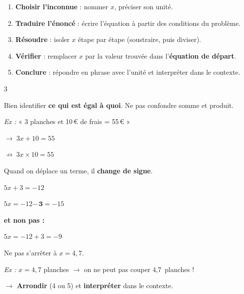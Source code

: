 \documentclass[a4paper,10pt]{article}
\begin{document}
\vspace{2pt}

\begin{methbox}
\begin{enumerate}[label=\textbf{\arabic*.},leftmargin=18pt]
  \item \textbf{Choisir l'inconnue} : nommer $x$, préciser son unité.
  \item \textbf{Traduire l'énoncé} : écrire l'équation à partir des conditions du problème.
  \item \textbf{Résoudre} : isoler $x$ étape par étape (soustraire, puis diviser).
  \item \textbf{Vérifier} : remplacer $x$ par la valeur trouvée dans l'\textbf{équation de départ}.
  \item \textbf{Conclure} : répondre en phrase avec l'unité et interpréter dans le contexte.
\end{enumerate}
\end{methbox}

\vspace{2pt}

\begin{multicols}{3}

\begin{piegebox}
{\small Bien identifier \textbf{ce qui est égal à quoi}. Ne pas confondre somme et produit.

\medskip
\textit{Ex :} « 3 planches et 10\,€ de frais = 55\,€ »

$\rightarrow\; 3x + 10 = 55$

$\not\rightarrow\; 3x \times 10 = 55$}
\end{piegebox}

\columnbreak

\begin{piegebox}
{\small Quand on déplace un terme, il \textbf{change de signe}.

\medskip
$5x + 3 = -12$

$5x = -12 \mathbf{-\,3} = -15$

\textbf{et non pas :}

$5x = -12 + 3 = -9$~\rlap{$\;\boldsymbol{\times}$}}
\end{piegebox}

\columnbreak

\begin{piegebox}
{\small Ne pas s'arrêter à $x = 4{,}7$.

\medskip
\textit{Ex :} $x = 4{,}7$ planches $\rightarrow$ on ne peut pas couper 4,7~planches !

$\rightarrow$ \textbf{Arrondir} (4 ou 5) et \textbf{interpréter} dans le contexte.}
\end{piegebox}

\end{multicols}
\end{document}

